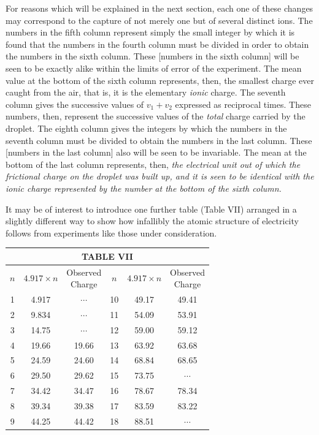 For reasons which will be explained in the next section, each one of
these changes may correspond to the capture of not merely one but of
several distinct ions. The numbers in the fifth column represent simply
the small integer by which it is found that the numbers in the fourth
column must be divided in order to obtain the numbers in the sixth
column. These {[}numbers in the sixth column{]} will be seen to be
exactly alike within the limits of error of the experiment. The mean
value at the bottom of the sixth column represents, then, the smallest
charge ever caught from the air, that is, it is the elementary
\emph{ionic} charge. The seventh column gives the successive values of
$v_1 + v_2$ expressed as reciprocal times. These numbers,
then, represent the successive values of the \emph{total} charge carried
by the droplet. The eighth column gives the integers by which the
numbers in the seventh column must be divided to obtain the numbers in
the last column. These {[}numbers in the last column{]} also will be
seen to be invariable. The mean at the bottom of the last column
represents, then, \emph{the electrical unit out of which the frictional
charge on the droplet was built up, and it is seen to be identical with
the ionic charge represented by the number at the bottom of the sixth
column.}

It may be of interest to introduce one further table (Table VII)
arranged in a slightly different way to show how infallibly the atomic
structure of electricity follows from experiments like those under
consideration.

\begin{table}[htp]
\centering
\begin{tabular}{c|c|c||c|c|c}
\multicolumn{6}{c}{TABLE VII}\\[3pt]
\hline
\hline
\rule{0pt}{1.5\normalbaselineskip}
$n$ & $4.917\!\times\!{n}$ & \makecell{\small{Observed}\\\small{Charge}} & $n$ & $4.917\!\times\!{n}$ & \makecell{\small{Observed}\\\small{Charge}}\\[8pt]
\hline
\rule{0pt}{1\normalbaselineskip}
1 & 4.917 & $\cdots$ & 10 & 49.17 & 49.41\\
2 & 9.834 & $\cdots$ & 11 & 54.09 & 53.91\\
3 & 14.75 & $\cdots$ & 12 & 59.00 & 59.12\\
4 & 19.66 & 19.66  & 13 & 63.92 & 63.68\\
5 & 24.59 & 24.60  & 14 & 68.84 & 68.65\\
6 & 29.50 & 29.62  & 15 & 73.75 & $\cdots$\\
7 & 34.42 & 34.47  & 16 & 78.67 & 78.34\\
8 & 39.34 & 39.38  & 17 & 83.59 & 83.22\\
9 & 44.25 & 44.42  & 18 & 88.51 & $\cdots$\\[3pt]
\hline
\end{tabular}
\end{table}

